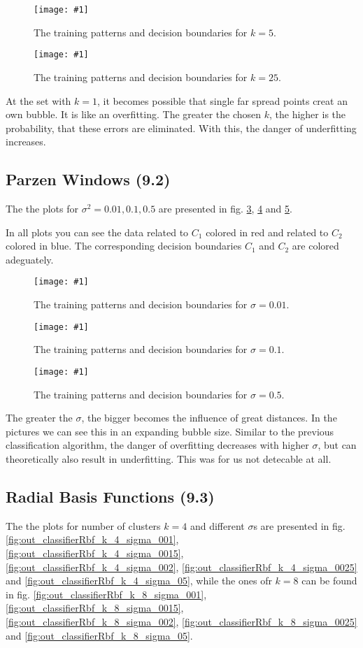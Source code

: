 \documentclass[a4paper,headings=small]{scrartcl}
\newcommand{\image}[3]{
\begin{figure}[htbp]
\centering
\texttt{[image: \#1]}
\caption{#3}
\label{fig:#1}
\end{figure}
}
\begin{document}
\image{out_classifierKnn_k_5}{\classifierPlotWidth}%
	{The training patterns and decision boundaries for $k = 5$.}

\image{out_classifierKnn_k_25}{\classifierPlotWidth}%
	{The training patterns and decision boundaries for $k = 25$.}

At the set with $k = 1$, it becomes possible that single far spread points creat an own bubble.
It is like an overfitting. The greater the chosen $k$, the higher is the probability, that these errors are eliminated.
With this, the danger of underfitting increases.


\subsection{Parzen Windows (9.2)}
The the plots for $\sigma^2 = 0.01, 0.1, 0.5$ are presented in fig.
\ref{fig:out_classifierParzen_sigma_001},
\ref{fig:out_classifierParzen_sigma_01} and
\ref{fig:out_classifierParzen_sigma_05}.

In all plots you can see the data related to $C_1$ colored in red and related to $C_2$ colored in blue.
The corresponding decision boundaries $C_1$ and $C_2$ are colored adeguately.

\image{out_classifierParzen_sigma_001}{\classifierPlotWidth}%
	{The training patterns and decision boundaries for $\sigma = 0.01$.}

\image{out_classifierParzen_sigma_01}{\classifierPlotWidth}%
	{The training patterns and decision boundaries for $\sigma = 0.1$.}

\image{out_classifierParzen_sigma_05}{\classifierPlotWidth}%
	{The training patterns and decision boundaries for $\sigma = 0.5$.}

The greater the $\sigma$, the bigger becomes the influence of great distances.
In the pictures we can see this in an expanding bubble size.
Similar to the previous classification algorithm, the danger of overfitting decreases with higher $\sigma$,
but can theoretically also result in underfitting.
This was for us not detecable at all.


\subsection{Radial Basis Functions (9.3)}
The the plots for number of clusters $k = 4$ and different $\sigma$s are presented in fig.
\ref{fig:out_classifierRbf_k_4_sigma_001},
\ref{fig:out_classifierRbf_k_4_sigma_0015},
\ref{fig:out_classifierRbf_k_4_sigma_002},
\ref{fig:out_classifierRbf_k_4_sigma_0025} and
\ref{fig:out_classifierRbf_k_4_sigma_05},
while the ones ofr $k = 8$ can be found in fig.
\ref{fig:out_classifierRbf_k_8_sigma_001},
\ref{fig:out_classifierRbf_k_8_sigma_0015},
\ref{fig:out_classifierRbf_k_8_sigma_002},
\ref{fig:out_classifierRbf_k_8_sigma_0025} and
\ref{fig:out_classifierRbf_k_8_sigma_05}.
\end{document}
